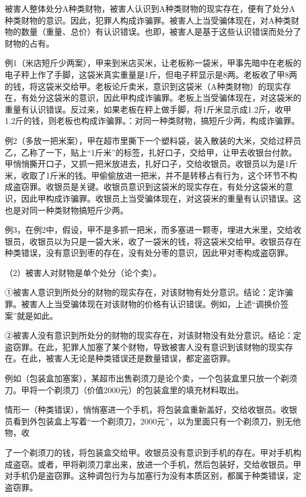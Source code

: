 被害人整体处分A种类财物，被害人认识到A种类财物的现实存在，便有了处分A种类财物的意识。因此，犯罪人构成诈骗罪。被害人上当受骗体现在，对A种类财物的数量（重量、总价）有认识错误。也即，被害人是基于这些认识错误而处分了财物的占有。

例1（米店短斤少两案），甲来到米店买米，让老板称一袋米，甲事先暗中在老板的电子秤上作了手脚，这袋米真实重量是1斤，但电子秤显示是8两。老板收了甲8两的钱，将这袋米交给甲。老板论斤卖米，意识到这袋米（A种类财物）的现实存在，有处分这袋米的意识，因此甲构成诈骗罪。老板上当受骗体现在，对这袋米的重量有认识错误。反过来，如果老板在秤上做手脚，将1斤米显示成1.2斤，收甲1.2斤的钱，则老板也构成诈骗罪。：对同一种类财物，搞短斤少两，构成诈骗罪。

例2（多放一把米案），甲在超市里撕下一个塑料袋，装入散装的大米，交给过秤员乙，乙称了一下，贴上“1斤米”的标签，扎好口子，交给甲，让甲去收银台付款。甲悄悄撕开口子，又抓一把米放进去，扎好口子，交给收银员。收银员以为是1斤米，收取了1斤米的钱。甲偷偷放进一把米，并不是转移占有行为，这个环节不构成盗窃罪。收银员是关键。收银员意识到这袋米的现实存在，有处分这袋米的意识，因此甲构成诈骗罪。收银员上当受骗体现在，对这袋米的重量有认识错误。这也是对同一种类财物搞短斤少两。

例3，在例2中，假设，甲不是多抓一把米，而多塞进一颗枣，埋进大米里，交给收银员，收银员以为只是一袋大米，收了一袋米的钱，将这袋米交给甲。收银员存在种类错误，没有意识到枣的存在，没有处分枣的意识，因此甲对枣构成盗窃罪。

（2）被害人对财物是单个处分（论个卖）。

①被害人意识到所处分的财物的现实存在，对该财物有处分意识。结论：定诈骗罪。被害人上当受骗体现在对该财物的价格有认识错误。例如，上述“调换价签案”就是如此。

②被害人没有意识到所处分的财物的现实存在，对该财物没有处分意识。结论：定盗窃罪。在此，犯罪人加塞了某个财物，导致被害人没有意识到该财物的现实存在。在此，被害人无论是种类错误还是数量错误，都定盗窃罪。

例如（包装盒加塞案），某超市出售剃须刀是论个卖，一个包装盒里只放一个剃须刀。甲将一个剃须刀（价值2000元）的包装盒里的填充材料取出。

情形一（种类错误），悄悄塞进一个手机，将包装盒重新盖好，交给收银员。收银员看到外包装盒上写着“一个剃须刀，2000元”，以为里面只有一个剃须刀，别无他物，收

了一个剃须刀的钱，将包装盒交给甲。收银员没有意识到手机的存在。甲对手机构成盗窃。或者，甲将剃须刀拿出来，放进一个手机，然后包装好，交给收银员。甲对手机仍是盗窃罪。这种调包行为与加塞行为没有本质区别，都属于种类错误，定盗窃罪。

